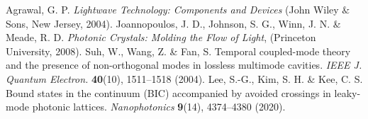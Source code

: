\documentclass[%
 reprint,
superscriptaddress,
 amsmath,amssymb, aps,
]{revtex4-1}
\begin{document}
\begin{thebibliography}{1}
 Agrawal, G. P. \emph{Lightwave Technology: Components and Devices} (John Wiley $\&$ Sons, New Jersey, 2004).
 Joannopoulos, J. D., Johnson, S. G., Winn, J. N. \& Meade, R. D. \emph{Photonic Crystals: Molding the Flow of Light}, (Princeton University, 2008).
 Suh, W., Wang, Z. \& Fan, S. Temporal coupled-mode theory and the presence of non-orthogonal modes in lossless multimode cavities. \emph{IEEE J. Quantum Electron.} {\bf 40}(10), 1511--1518 (2004).
 Lee, S.-G., Kim, S. H. \& Kee, C. S. Bound states in the continuum (BIC) accompanied by avoided crossings in leaky-mode photonic lattices. \emph{Nanophotonics} {\bf 9}(14), 4374--4380 (2020).

\end{thebibliography}
\end{document}
